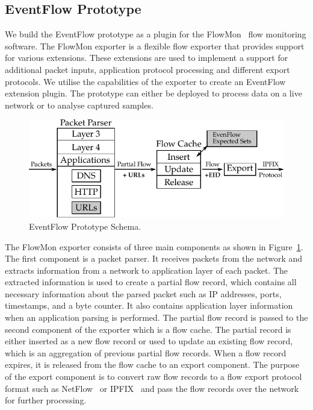 \subsection{EventFlow Prototype} \label{subsec:eventflow-prototype}

We build the EventFlow prototype as a plugin for the FlowMon~\cite{FlowmonNetworks--Flowmon} flow monitoring software. The FlowMon exporter is a flexible flow exporter that provides support for various extensions. These extensions are used to implement a support for additional packet inputs, application protocol processing and different export protocols. We utilise the capabilities of the exporter to create an EventFlow extension plugin. The prototype can either be deployed to process data on a live network or to analyse captured samples.

\begin{figure}[!tb]
    \centering 
    \includegraphics{figures/paper-eventflow/prototype-schema}
    \caption{EventFlow Prototype Schema.}
    \label{fig:eventflow-prototype-schema}
\end{figure}


The FlowMon exporter consists of three main components as shown in Figure~\ref{fig:eventflow-prototype-schema}. The first component is a packet parser. It receives packets from the network and extracts information from a network to application layer of each packet. The extracted information is used to create a partial flow record, which contains all necessary information about the parsed packet such as IP addresses, ports, timestamps, and a byte counter. It also contains application layer information when an application parsing is performed. The partial flow record is passed to the second component of the exporter which is a flow cache. The partial record is either inserted as a new flow record or used to update an existing flow record, which is an aggregation of previous partial flow records. When a flow record expires, it is released from the flow cache to an export component. The purpose of the export component is to convert raw flow records to a flow export protocol format such as NetFlow~\cite{rfc3954} or IPFIX~\cite{rfc7011} and pass the flow records over the network for further processing.

